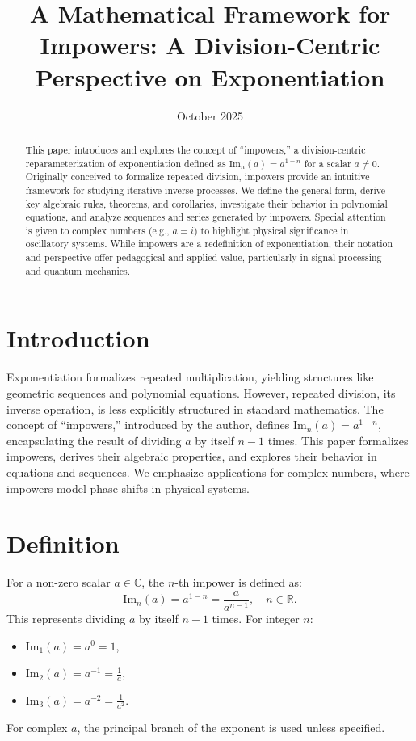 \documentclass{article}
\begin{document}
\title{A Mathematical Framework for Impowers: A Division-Centric Perspective on Exponentiation}
\author{}
\date{October 2025}
\maketitle

\begin{abstract}
This paper introduces and explores the concept of ``impowers,'' a division-centric reparameterization of exponentiation defined as \(\text{Im}_n(a) = a^{1-n}\) for a scalar \(a \neq 0\). Originally conceived to formalize repeated division, impowers provide an intuitive framework for studying iterative inverse processes. We define the general form, derive key algebraic rules, theorems, and corollaries, investigate their behavior in polynomial equations, and analyze sequences and series generated by impowers. Special attention is given to complex numbers (e.g., \(a = i\)) to highlight physical significance in oscillatory systems. While impowers are a redefinition of exponentiation, their notation and perspective offer pedagogical and applied value, particularly in signal processing and quantum mechanics.
\end{abstract}

\section{Introduction}
Exponentiation formalizes repeated multiplication, yielding structures like geometric sequences and polynomial equations. However, repeated division, its inverse operation, is less explicitly structured in standard mathematics. The concept of ``impowers,'' introduced by the author, defines \(\text{Im}_n(a) = a^{1-n}\), encapsulating the result of dividing \(a\) by itself \(n-1\) times. This paper formalizes impowers, derives their algebraic properties, and explores their behavior in equations and sequences. We emphasize applications for complex numbers, where impowers model phase shifts in physical systems.

\section{Definition}
For a non-zero scalar \(a \in \mathbb{C}\), the \(n\)-th impower is defined as:
\[
\text{Im}_n(a) = a^{1-n} = \frac{a}{a^{n-1}}, \quad n \in \mathbb{R}.
\]
This represents dividing \(a\) by itself \(n-1\) times. For integer \(n\):
\begin{itemize}
    \item \(\text{Im}_1(a) = a^0 = 1\),
    \item \(\text{Im}_2(a) = a^{-1} = \frac{1}{a}\),
    \item \(\text{Im}_3(a) = a^{-2} = \frac{1}{a^2}\).
\end{itemize}
For complex \(a\), the principal branch of the exponent is used unless specified.
\end{document}
